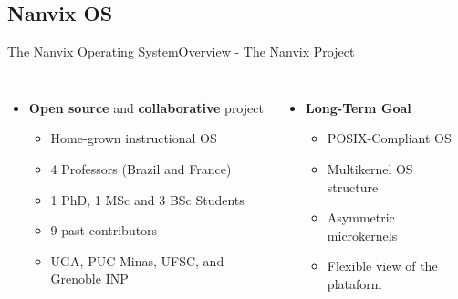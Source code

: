 

	\subsection{Nanvix OS}

		\begin{frame}[fragile]{The Nanvix Operating System}{Overview - The Nanvix Project}

		\begin{columns}[totalwidth=\linewidth]


			\begin{columns}[totalwidth=\linewidth]

					\begin{itemize}
						\item \textbf{Open source} and \textbf{collaborative} project
						\begin{itemize}
							\item Home-grown instructional OS
							\item 4 Professors (Brazil and France)
							\item 1 PhD, 1 MSc and 3 BSc Students
							\item 9 past contributors
							\item UGA, PUC Minas, UFSC, and Grenoble INP
						\end{itemize}
					\end{itemize}

			\end{columns} 

			\vspace{.5cm}

			\begin{columns}[totalwidth=\linewidth]

					\begin{itemize}
						\item \textbf{Long-Term Goal}
						\begin{itemize}
							\item POSIX-Compliant OS
							\item Multikernel OS structure
							\item Asymmetric microkernels
							\item Flexible view of the plataform
						\end{itemize}
					\end{itemize}


\end{columns}
\end{columns}
\end{frame}
